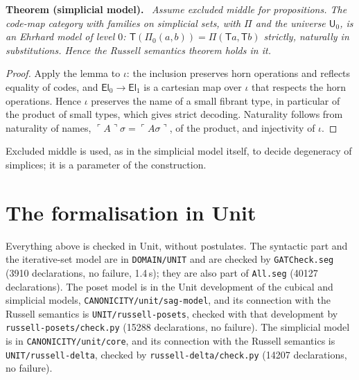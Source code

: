 \documentclass[11pt]{article}
\newenvironment{theorem}[1]{\par\medskip\noindent\textbf{Theorem #1.}\ \itshape}{\par\medskip}
\theoremstyle{definition}
\theoremstyle{remark}
\newcommand{\U}{\mathsf U}
\newcommand{\T}{\mathsf T}
\newcommand{\code}[1]{\ulcorner #1\urcorner}
\newcommand{\seg}[1]{\texttt{#1}}
\begin{document}
\begin{theorem}{(simplicial model)}
Assume excluded middle for propositions. The code-map category with
families on simplicial sets, with $\Pi$ and the universe $\U_0$, is an
Ehrhard model of level $0$: $\T(\Pi_0(a,b))=\Pi(\T a,\T b)$ strictly,
naturally in substitutions. Hence the Russell semantics theorem holds in
it.
\end{theorem}
\begin{proof}
Apply the lemma to $\iota$: the inclusion preserves horn operations and
reflects equality of codes, and $\mathsf{El}_0\to\mathsf{El}_1$ is a
cartesian map over $\iota$ that respects the horn operations. Hence
$\iota$ preserves the name of a small fibrant type, in particular of the
product of small types, which gives strict decoding. Naturality follows
from naturality of names, $\code{A}\sigma=\code{A\sigma}$, of the product,
and injectivity of $\iota$.
\end{proof}

Excluded middle is used, as in the simplicial model itself, to decide
degeneracy of simplices; it is a parameter of the construction.

\section{The formalisation in Unit}\label{sec:unit}

Everything above is checked in Unit, without postulates. The syntactic
part and the iterative-set model are in \seg{DOMAIN/UNIT} and are checked
by \seg{GATCheck.seg} (3910 declarations, no failure, 1.4\,s); they are also
part of \seg{All.seg} (40127 declarations). The poset model is in the
Unit development of the cubical and simplicial models,
\seg{CANONICITY/unit/sag-model}, and its connection with the Russell
semantics is \seg{UNIT/russell-posets}, checked with that development by
\seg{russell-posets/check.py} (15288 declarations, no failure). The
simplicial model is in \seg{CANONICITY/unit/core}, and its connection with
the Russell semantics is \seg{UNIT/russell-delta}, checked by
\seg{russell-delta/check.py} (14207 declarations, no failure).
\end{document}

